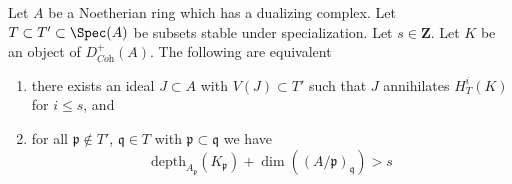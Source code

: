 %

\begin{proposition}
\label{proposition-annihilator-complex}
Let $A$ be a Noetherian ring which has a dualizing complex.
Let $T \subset T' \subset \Spec(A)$ be subsets stable under
specialization. Let $s \in \mathbf{Z}$. Let $K$ be an object of
$D_{\textit{Coh}}^+(A)$. The following are equivalent
\begin{enumerate}
\item there exists an ideal $J \subset A$ with $V(J) \subset T'$
such that $J$ annihilates $H^i_T(K)$ for $i \leq s$, and
\item for all $\mathfrak p \not \in T'$,
$\mathfrak q \in T$ with $\mathfrak p \subset \mathfrak q$
we have
$$
\text{depth}_{A_\mathfrak p}(K_\mathfrak p) +
\dim((A/\mathfrak p)_\mathfrak q) > s
$$
\end{enumerate}
\end{proposition}


